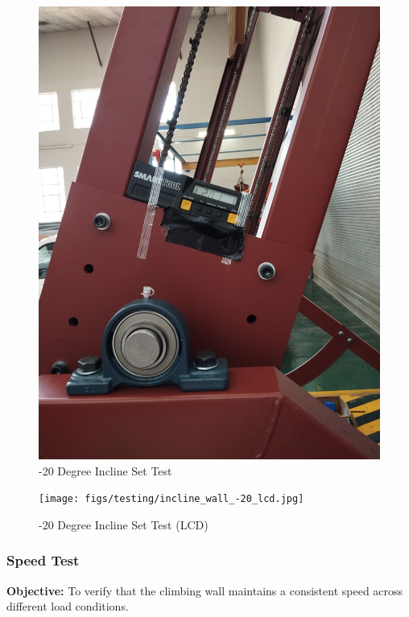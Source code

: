 \begin{minipage}{0.42\textwidth}
    \begin{figure}[H]
        \centering
        \includegraphics[width=\textwidth]{figs/testing/incline_wall_-20.jpg}
        \caption{-20 Degree Incline Set Test}
        \label{fig:incline_set_test1}
    \end{figure}
\end{minipage}
\hfill
\begin{minipage}{0.55\textwidth}
    \begin{figure}[H]
        \centering
        \texttt{[image: figs/testing/incline\_wall\_-20\_lcd.jpg]}
        \caption{-20 Degree Incline Set Test (LCD)}
        \label{fig:incline_set_test2}
    \end{figure}
\end{minipage}

\subsubsection{Speed Test}
\textbf{Objective:} To verify that the climbing wall maintains a consistent speed across different load conditions.

